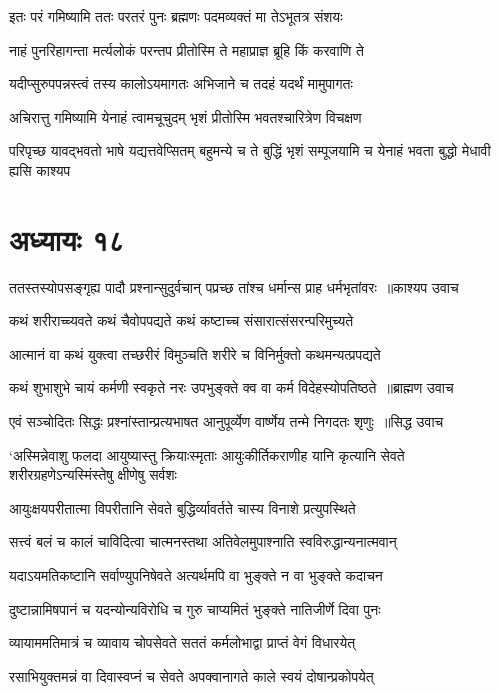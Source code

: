 \twolineshloka
{इतः परं गमिष्यामि ततः परतरं पुनः}
{ब्रह्मणः पदमव्यक्तं मा तेऽभूतत्र संशयः}


\twolineshloka
{नाहं पुनरिहागन्ता मर्त्यलोकं परन्तप}
{प्रीतोस्मि ते महाप्राज्ञ ब्रूहि किं करवाणि ते}


\twolineshloka
{यदीप्सुरुपपन्नस्त्वं तस्य कालोऽयमागतः}
{अभिजाने च तदहं यदर्थं मामुपागतः}


\twolineshloka
{अचिरात्तु गमिष्यामि येनाहं त्वामचूचुदम्}
{भृशं प्रीतोस्मि भवतश्चारित्रेण विचक्षण}


परिपृच्छ यावद्भवतो भाषे यद्यत्तवेप्सितम्
\twolineshloka
{बहुमन्ये च ते बुद्धिं भृशं सम्पूजयामि च}
{येनाहं भवता बुद्धो मेधावी ह्यसि काश्यप}


\chapter{अध्यायः १८}
\threelineshloka
{ततस्तस्योपसङ्गृह्य पादौ प्रश्नान्सुदुर्वचान्}
{पप्रच्छ तांश्च धर्मान्स प्राह धर्मभृतांवरः ॥काश्यप उवाच}
{}


\twolineshloka
{कथं शरीराच्च्यवते कथं चैवोपपद्यते}
{कथं कष्टाच्च संसारात्संसरन्परिमुच्यते}


\twolineshloka
{आत्मानं वा कथं युक्त्वा तच्छरीरं विमुञ्चति}
{शरीरे च विनिर्मुक्तो कथमन्यत्प्रपद्यते}


\threelineshloka
{कथं शुभाशुभे चायं कर्मणी स्वकृते नरः}
{उपभुङ्क्ते क्व वा कर्म विदेहस्योपतिष्ठते ॥ब्राह्मण उवाच}
{}


\threelineshloka
{एवं सञ्चोदितः सिद्धः प्रश्नांस्तान्प्रत्यभाषत}
{आनुपूर्व्येण वार्ष्णेय तन्मे निगदतः शृणुः ॥सिद्ध उवाच}
{}


\threelineshloka
{`अस्मिन्नेवाशु फलदा आयुष्यास्तु क्रियाःस्मृताः}
{आयुःकीर्तिकराणीह यानि कृत्यानि सेवते}
{शरीरग्रहणेऽन्यस्मिंस्तेषु क्षीणेषु सर्वशः}


\twolineshloka
{आयुःक्षयपरीतात्मा विपरीतानि सेवते}
{बुद्धिर्व्यावर्तते चास्य विनाशे प्रत्युपस्थिते}


\twolineshloka
{सत्त्वं बलं च कालं चाविदित्वा चात्मनस्तथा}
{अतिवेलमुपाश्नाति स्वविरुद्धान्यनात्मवान्}


\twolineshloka
{यदाऽयमतिकष्टानि सर्वाण्युपनिषेवते}
{अत्यर्थमपि वा भुङ्क्ते न वा भुङ्क्ते कदाचन}


\twolineshloka
{दुष्टान्नामिषपानं च यदन्योन्यविरोधि च}
{गुरु चाप्यमितं भुङ्क्ते नातिजीर्णे दिवा पुनः}


\twolineshloka
{व्यायाममतिमात्रं च व्यावाय चोपसेवते}
{सततं कर्मलोभाद्वा प्राप्तं वेगं विधारयेत्}


\twolineshloka
{रसाभियुक्तमन्नं वा दिवास्वप्नं च सेवते}
{अपक्वानागते काले स्वयं दोषान्प्रकोपयेत्}


